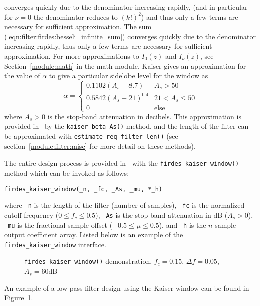 converges quickly due to the denominator increasing rapidly, 
(and in particular for $\nu=0$ the denominator reduces to $(k!)^2$)
and thus only a few terms are necessary for sufficient approximation.
%
The sum (\ref{eqn:filter:firdes:besseli_infinite_sum}) converges quickly
due to the denominator increasing rapidly, thus only a few terms are
necessary for sufficient approximation.
For more approximations to $I_0(z)$ and $I_\nu(z)$,
see Section~\ref{module:math} in the math module.
%
Kaiser gives an approximation for the value of $\alpha$ to give a
particular sidelobe level for the window as
\cite[(3.2.7)]{Vaidyanathan:1993}
\begin{equation}
\label{eq:kaiser_alpha}
    \alpha =
    \begin{cases}
        0.1102 (A_s - 8.7)      &   A_s > 50 \\
        0.5842 (A_s - 21)^{0.4} &   21 < A_s \le 50 \\
        0                       &   \text{else}
    \end{cases}
\end{equation}
%
where $A_s > 0$ is the stop-band attenuation in decibels.
%
This approximation is provided in \liquid\ by the
{\tt kaiser\_beta\_As()} method,
and the length of the filter can be approximated with
{\tt estimate\_req\_filter\_len()}
(see section~\ref{module:filter:misc} for more detail on these methods).

The entire design process is provided in \liquid\ with the
{\tt firdes\_kaiser\_window()} method which can be invoked as follows:
%
\begin{Verbatim}[fontsize=\small]
    firdes_kaiser_window(_n, _fc, _As, _mu, *_h)
\end{Verbatim}
%
where
{\tt \_n} is the length of the filter (number of samples),
{\tt \_fc} is the normalized cutoff frequency ($0 \leq f_c \leq 0.5$),
{\tt \_As} is the stop-band attenuation in dB ($A_s > 0$),
{\tt \_mu} is the fractional sample offset ($-0.5 \leq \mu \leq 0.5$),
and {\tt *\_h} is the $n$-sample output coefficient array.
%
Listed below is an example of the {\tt firdes\_kaiser\_window}
interface.
%

%
\begin{figure}
\centering
{}
\caption{{\tt firdes\_kaiser\_window()} demonstration, $f_c=0.15$,
         $\Delta f=0.05$, $A_s=60$dB}
\label{fig:module:filter:firdes_kaiser}
\end{figure}
%
An example of a low-pass filter design using the Kaiser window can be
found in Figure~\ref{fig:module:filter:firdes_kaiser}.



